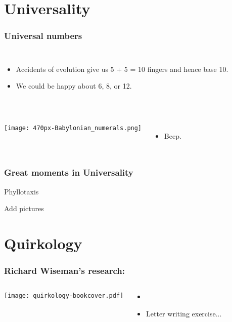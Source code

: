 \section{Universality}

\begin{frame}
  \frametitle{Universal numbers}

  \begin{columns}
    \begin{itemize}
    \item<1-> 
      Accidents of evolution give us 5 + 5 = 10 fingers
      and hence base 10.
    \item<2->
      We could be happy about 6, 8, or 12.
    \end{itemize}
  \end{columns}
  

\end{frame}

\begin{frame}
  \frametitle{}


  \begin{columns}
    \texttt{[image: 470px-Babylonian\_numerals.png]}
    \begin{itemize}
    \item<1->
      Beep.
    \end{itemize}
  \end{columns}
\end{frame}

\begin{frame}
  \frametitle{Great moments in Universality}

  Phyllotaxis

  Add pictures
\end{frame}


\section{Quirkology}

\begin{frame}
  \frametitle{Richard Wiseman's research:}
  
  \begin{columns}
    \texttt{[image: quirkology-bookcover.pdf]}\\
    \begin{itemize}
    \item<1-> 
    \item<2-> 
      Letter writing exercise...
    \end{itemize}
  \end{columns}
  
\end{frame}

